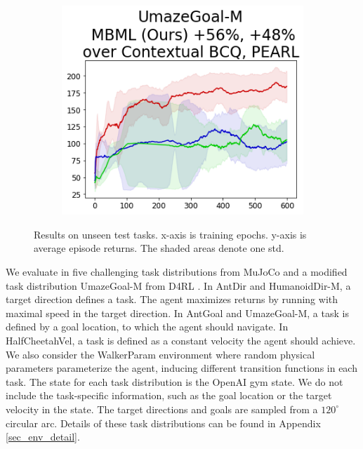 \begin{figure}[!t]
\begin{minipage}{0.69\textwidth}
{            \begin{subfigure}{\mujocobaselinefigsize\paperwidth}
                \includegraphics[width=\linewidth]{chapter_2/fig/wd-UmazeGoal-M.png}
            \end{subfigure}}

    \end{minipage}
    \caption{Results on unseen test tasks.
        x-axis is training epochs.
        y-axis is average episode returns.
        The shaded areas denote one std.
    }\label{fig:testing_performance}
\end{figure}

We evaluate in five challenging task distributions from MuJoCo \cite{todorov2012mujoco} and a modified task distribution UmazeGoal-M from D4RL \cite{fu2020d4rl}. In AntDir and HumanoidDir-M, a target direction defines a task. The agent maximizes returns by running with maximal speed in the target direction. In AntGoal and UmazeGoal-M, a task is defined by a goal location, to which the agent should navigate. In HalfCheetahVel, a task is defined as a constant velocity the agent should achieve. We also consider the WalkerParam environment where random physical parameters parameterize the agent, inducing different transition functions in each task. The state for each task distribution is the OpenAI gym state. We do not include the task-specific information, such as the goal location or the target velocity in the state. The target directions and goals are sampled from a $120^{\circ}$ circular arc. Details of these task distributions can be found in Appendix \ref{sec_env_detail}.


